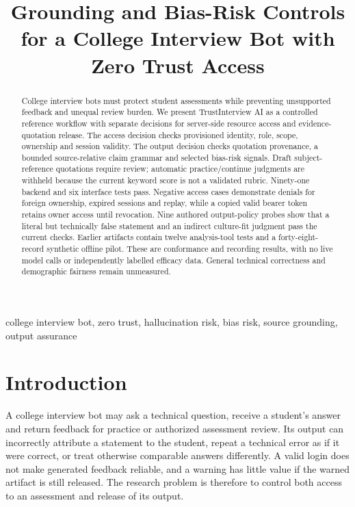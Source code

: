 \documentclass[conference]{IEEEtran}
\begin{document}
\title{Grounding and Bias-Risk Controls for a College Interview Bot with Zero Trust Access}
\author{%
}
\maketitle

\begin{abstract}
College interview bots must protect student assessments while preventing unsupported feedback and unequal review burden. We present TrustInterview AI as a controlled reference workflow with separate decisions for server-side resource access and evidence-quotation release. The access decision checks provisioned identity, role, scope, ownership and session validity. The output decision checks quotation provenance, a bounded source-relative claim grammar and selected bias-risk signals. Draft subject-reference quotations require review; automatic practice/continue judgments are withheld because the current keyword score is not a validated rubric. Ninety-one backend and six interface tests pass. Negative access cases demonstrate denials for foreign ownership, expired sessions and replay, while a copied valid bearer token retains owner access until revocation. Nine authored output-policy probes show that a literal but technically false statement and an indirect culture-fit judgment pass the current checks. Earlier artifacts contain twelve analysis-tool tests and a forty-eight-record synthetic offline pilot. These are conformance and recording results, with no live model calls or independently labelled efficacy data. General technical correctness and demographic fairness remain unmeasured.
\end{abstract}
\begin{IEEEkeywords}
college interview bot, zero trust, hallucination risk, bias risk, source grounding, output assurance
\end{IEEEkeywords}

\section{Introduction}
A college interview bot may ask a technical question, receive a student's answer and return feedback for practice or authorized assessment review. Its output can incorrectly attribute a statement to the student, repeat a technical error as if it were correct, or treat otherwise comparable answers differently. A valid login does not make generated feedback reliable, and a warning has little value if the warned artifact is still released. The research problem is therefore to control both access to an assessment and release of its output.
\end{document}
